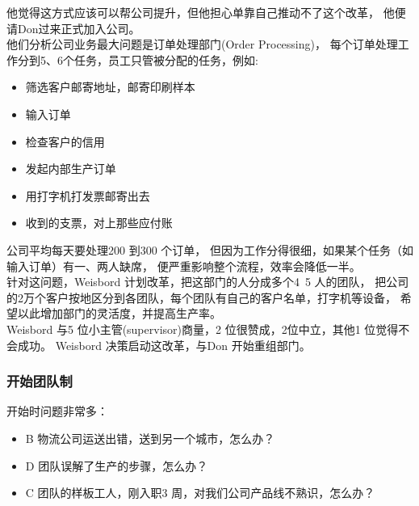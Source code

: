 他觉得这方式应该可以帮公司提升，但他担心单靠自己推动不了这个改革，
他便请Don过来正式加入公司。\\
他们分析公司业务最大问题是订单处理部门(Order Processing)，
每个订单处理工作分到5、6个任务，员工只管被分配的任务，例如:

\begin{itemize}
\tightlist
\item
  筛选客户邮寄地址，邮寄印刷样本
\item
  输入订单
\item
  检查客户的信用
\item
  发起内部生产订单
\item
  用打字机打发票邮寄出去
\item
  收到的支票，对上那些应付账
\end{itemize}

公司平均每天要处理200 到300 个订单，
但因为工作分得很细，如果某个任务（如输入订单）有一、两人缺席，
便严重影响整个流程，效率会降低一半。\\
针对这问题，Weisbord 计划改革，把这部门的人分成多个4~5 人的团队，
把公司的2万个客户按地区分到各团队，每个团队有自己的客户名单，打字机等设备，
希望以此增加部门的灵活度，并提高生产率。\\
Weisbord 与5 位小主管(supervisor)商量，2 位很赞成，2位中立，其他1
位觉得不会成功。 Weisbord 决策启动这改革，与Don 开始重组部门。\\

\hypertarget{ux5f00ux59cbux56e2ux961fux5236}{%
\subsubsection{开始团队制}\label{ux5f00ux59cbux56e2ux961fux5236}}

开始时问题非常多：

\begin{itemize}
\tightlist
\item
  B 物流公司运送出错，送到另一个城市，怎么办？
\item
  D 团队误解了生产的步骤，怎么办？
\item
  C 团队的样板工人，刚入职3 周，对我们公司产品线不熟识，怎么办？
\end{itemize}


